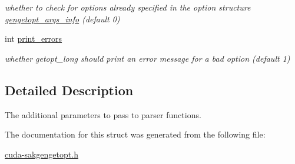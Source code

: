 \begin{DoxyCompactItemize}
\begin{DoxyCompactList}\small\item\em whether to check for options already specified in the option structure \hyperlink{structgengetopt__args__info}{gengetopt\-\_\-args\-\_\-info} (default 0) \end{DoxyCompactList}\item 
\hypertarget{structcmdline__parser__params_a3236f066777488e8502abe05ccd24455}{int \hyperlink{structcmdline__parser__params_a3236f066777488e8502abe05ccd24455}{print\-\_\-errors}}\label{structcmdline__parser__params_a3236f066777488e8502abe05ccd24455}

\begin{DoxyCompactList}\small\item\em whether getopt\-\_\-long should print an error message for a bad option (default 1) \end{DoxyCompactList}\end{DoxyCompactItemize}


\subsection{Detailed Description}
The additional parameters to pass to parser functions. 

The documentation for this struct was generated from the following file\-:\begin{DoxyCompactItemize}
\item 
\hyperlink{cuda-sakgengetopt_8h}{cuda-\/sakgengetopt.\-h}\end{DoxyCompactItemize}
